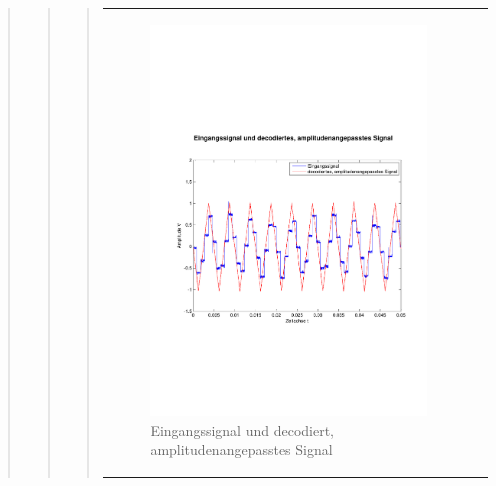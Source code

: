 \begin{quote}
\begin{quote}
\begin{quote}
            \begin{center}
                \begin{tabular}{ll}
                
                \hspace{-4cm}
                    \begin{minipage}{0.6\textwidth}
                        \begin{figure}[H]
                            \includegraphics[scale=0.4, trim = 0.8cm 7cm 0.8cm
                            8.5cm, clip]
                            {./Bilder/drei8_Eingang_vs_DecodiertAmpl-angepasst}
                              \caption{Eingangssignal und decodiert, \newline
                              amplitudenangepasstes Signal}
                        \end{figure}
                    \end{minipage}
                    

\end{tabular}
\end{center}
\end{quote}
\end{quote}
\end{quote}
